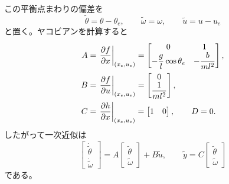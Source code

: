 \begin{example}[トルク入力をもつ単振子の局所線形化]
この平衡点まわりの偏差を
\begin{equation}
  \tilde{\theta}=\theta-\theta_e,\qquad
  \tilde{\omega}=\omega,\qquad
  \tilde{u}=u-u_e
\end{equation}
と置く。ヤコビアンを計算すると
\begin{align}
  A
  &=
  \left.\frac{\partial f}{\partial x}\right|_{(x_e,u_e)}
  =
  \begin{bmatrix}
    0&1\\
    -\dfrac{g}{l}\cos\theta_e&-\dfrac{b}{ml^2}
  \end{bmatrix},\\
  B
  &=
  \left.\frac{\partial f}{\partial u}\right|_{(x_e,u_e)}
  =
  \begin{bmatrix}
    0\\
    \dfrac{1}{ml^2}
  \end{bmatrix},\\
  C
  &=
  \left.\frac{\partial h}{\partial x}\right|_{(x_e,u_e)}
  =
  \begin{bmatrix}1&0\end{bmatrix},
  \qquad
  D=0.
\end{align}
したがって一次近似は
\begin{equation}
  \begin{bmatrix}
    \dot{\tilde{\theta}}\\
    \dot{\tilde{\omega}}
  \end{bmatrix}
  =
  A
  \begin{bmatrix}
    \tilde{\theta}\\
    \tilde{\omega}
  \end{bmatrix}
  +B\tilde{u},
  \qquad
  \tilde{y}=C
  \begin{bmatrix}
    \tilde{\theta}\\
    \tilde{\omega}
  \end{bmatrix}
\end{equation}
である。


\end{example}

